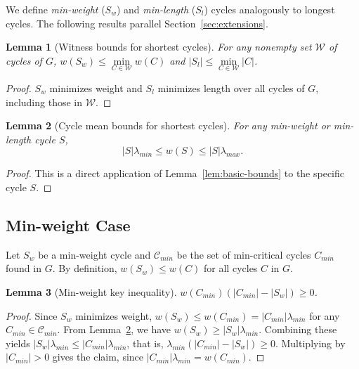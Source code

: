 \documentclass{article}
\newtheorem{lem}{Lemma}[section]
\theoremstyle{definition}
\begin{document}
We define \textit{min-weight} ($S_w$) and \textit{min-length} ($S_l$)
cycles analogously to longest cycles. The following results parallel
Section~\ref{sec:extensions}.

\begin{lem}[Witness bounds for shortest cycles]
\label{lem:witness-shortest}
For any nonempty set $\mathcal{W}$ of cycles of $G$, $w(S_w) \leq \min\limits_{C \in
  \mathcal{W}} w(C)$ and $|S_l| \leq \min\limits_{C \in \mathcal{W}} |C|$.
\end{lem}

\begin{proof}
$S_w$ minimizes weight and $S_l$ minimizes length over all cycles of
$G$, including those in $\mathcal{W}$.
\end{proof}

\begin{lem}[Cycle mean bounds for shortest cycles]
\label{lem:shortest-mean-bounds}
For any min-weight or min-length cycle $S$,
\begin{equation}
  |S| \lambda_{min} \leq w(S) \leq |S| \lambda_{max}.
\end{equation}
\end{lem}

\begin{proof}
This is a direct application of Lemma~\ref{lem:basic-bounds} to the
specific cycle $S$.
\end{proof}

\subsection{Min-weight Case}
\label{sec:min-weight-case}

Let $S_w$ be a min-weight cycle and $\mathcal{C}_{min}$ be the set of
min-critical cycles $C_{min}$ found in $G$. By definition, $w(S_w) \leq
w(C)$ for all cycles $C$ in $G$.

\begin{lem}[Min-weight key inequality]
  \label{lem:min-weight-key}
  $w(C_{min})(|C_{min}| - |S_w|) \geq 0$.
\end{lem}

\begin{proof}
Since $S_w$ minimizes weight, $w(S_w) \leq w(C_{min}) =
|C_{min}|\lambda_{min}$ for any $C_{min} \in \mathcal{C}_{min}$. From
Lemma~\ref{lem:shortest-mean-bounds}, we have $w(S_w) \geq
|S_w|\lambda_{min}$. Combining these yields $|S_w|\lambda_{min} \leq
|C_{min}|\lambda_{min}$, that is, $\lambda_{min}(|C_{min}| - |S_w|)
\geq 0$. Multiplying by $|C_{min}| > 0$ gives the claim, since
$|C_{min}|\lambda_{min} = w(C_{min})$.
\end{proof}
\end{document}
